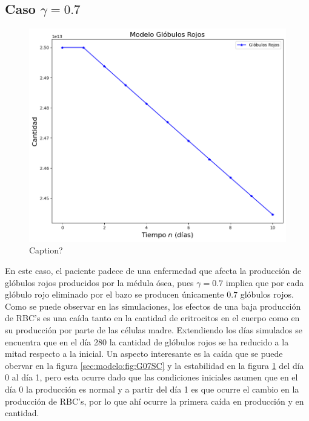 \subsection{Caso $\gamma=0.7$}
\begin{figure}[h]
    \centering
    \includegraphics[scale=0.6]{figures/BaseG07RBC.png}
    \caption{Caption?}
    \label{sec:modelo:fig:G07RBC}
\end{figure}

En este caso, el paciente padece de una enfermedad que afecta la producción de glóbulos rojos producidos por la médula ósea, pues $\gamma=0.7$ implica que por cada glóbulo rojo eliminado por el bazo se producen únicamente $0.7$ glóbulos rojos. Como se puede observar en las simulaciones, los efectos de una baja producción de RBC's es una caída tanto en la cantidad de eritrocitos en el cuerpo como en su producción por parte de las células madre. Extendiendo los días simulados se encuentra que en el día 280 la cantidad de glóbulos rojos se ha reducido a la mitad respecto a la inicial. Un aspecto interesante es la caída que se puede obervar en la figura \ref{sec:modelo:fig:G07SC} y la estabilidad en la figura \ref{sec:modelo:fig:G07RBC} del día 0 al día 1, pero esta ocurre dado que las condiciones iniciales asumen que en el día 0 la producción es normal y a partir del día 1 es que ocurre el cambio en la producción de RBC's, por lo que ahí ocurre la primera caída en producción y en cantidad. 

